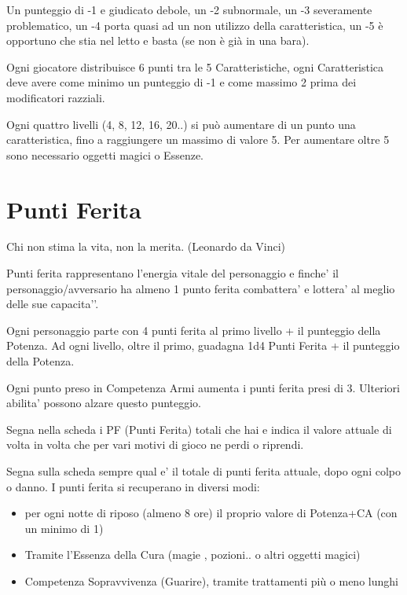 \documentclass[a4paper,11pt,twoside,openany]{book}
\begin{document}
Un punteggio di -1 e giudicato debole, un -2 subnormale, un -3 severamente problematico, un -4 porta quasi ad un non utilizzo della caratteristica, un -5 è opportuno che stia nel letto e basta (se non è già in una bara).

Ogni giocatore distribuisce 6 punti tra le 5 Caratteristiche, ogni Caratteristica deve avere come minimo un punteggio di -1 e come massimo 2 prima dei modificatori razziali.

Ogni quattro livelli (4, 8, 12, 16, 20..) si può aumentare di un punto una caratteristica, fino a raggiungere un massimo di valore 5. Per aumentare oltre 5 sono necessario oggetti magici o Essenze.


\section{Punti Ferita}

\begin{tcolorbox}[enhanced,arc=5pt,boxrule=0.3pt]{Chi non stima la vita, non la merita. (Leonardo da Vinci)}\end{tcolorbox}\medskip


Punti ferita rappresentano l’energia vitale del personaggio e finche’ il personaggio/avversario ha almeno 1 punto ferita combattera’ e lottera’ al meglio delle sue capacita'’.

Ogni personaggio parte con 4 punti ferita al primo livello + il punteggio della Potenza.
Ad ogni livello, oltre il primo, guadagna 1d4 Punti Ferita + il punteggio della Potenza.

Ogni punto preso in Competenza Armi aumenta i punti ferita presi di 3. Ulteriori abilita’ possono alzare questo punteggio.

Segna nella scheda i PF (Punti Ferita) totali che hai e indica il valore attuale di volta in volta che per vari motivi di gioco ne perdi o riprendi.

Segna sulla scheda sempre qual e’ il totale di punti ferita attuale, dopo ogni colpo o danno.
I punti ferita si recuperano in diversi modi:

\begin{itemize}
	\item
	      per ogni notte di riposo (almeno 8 ore) il proprio valore di Potenza+CA (con un minimo di 1)
	\item
	      Tramite l'Essenza della Cura (magie , pozioni.. o altri oggetti magici)
	\item
	      Competenza Sopravvivenza (Guarire), tramite trattamenti più o meno lunghi
\end{itemize}
\end{document}
